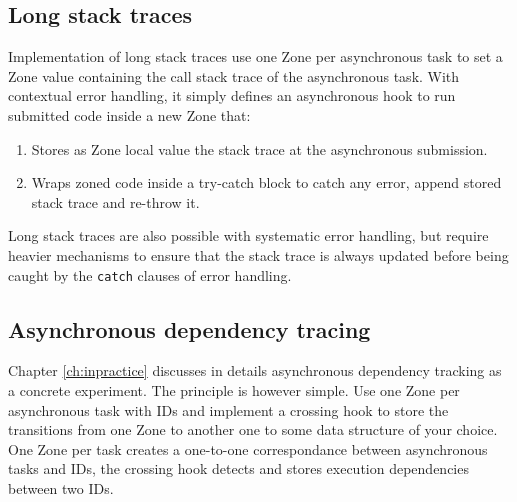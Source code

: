 \subsection*{Long stack traces}

Implementation of long stack traces use one Zone per asynchronous task to set a Zone value containing the call stack trace of the asynchronous task. With contextual error handling, it simply defines an asynchronous hook to run submitted code inside a new Zone that:
\begin{enumerate}
\item Stores as Zone local value the stack trace at the asynchronous submission.
\item Wraps zoned code inside a try-catch block to catch any error, append stored stack trace and re-throw it.
\end{enumerate}

Long stack traces are also possible with systematic error handling, but require heavier mechanisms to ensure that the stack trace is always updated before being caught by the \lstinline{catch} clauses of error handling.

\subsection*{Asynchronous dependency tracing}

Chapter \ref{ch:inpractice} discusses in details asynchronous dependency tracking as a concrete experiment. The principle is however simple. Use one Zone per asynchronous task with IDs and implement a crossing hook to store the transitions from one Zone to another one to some data structure of your choice. One Zone per task creates a one-to-one correspondance between asynchronous tasks and IDs, the crossing hook detects and stores execution dependencies between two IDs.
